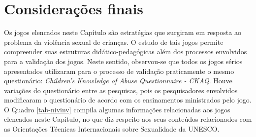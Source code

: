 









\newpage

\section{Considerações finais}\label{sssec:outros}

Os jogos elencados neste Capítulo são estratégias que surgiram em resposta ao problema da violência sexual de crianças. O estudo de tais jogos permite compreender suas estruturas didático-pedagógicas além dos processos envolvidos para a validação dos jogos. Neste sentido, observou-se que todos os jogos sérios apresentados utilizaram para o processo de validação praticamente o mesmo questionário: \textit{Children’s Knowledge of Abuse Questionnaire - CKAQ}. Houve variações do questionário entre as pesquisas, pois os pesquisadores envolvidos modificaram o questionário de acordo com os ensinamentos ministrados pelo jogo. O Quadro \ref{tab-nivinv} compila algumas informações relacionadas aos jogos elencados neste Capítulo, no que diz respeito aos seus conteúdos relacionados com as Orientações Técnicas Internacionais sobre Sexualidade da UNESCO. 

